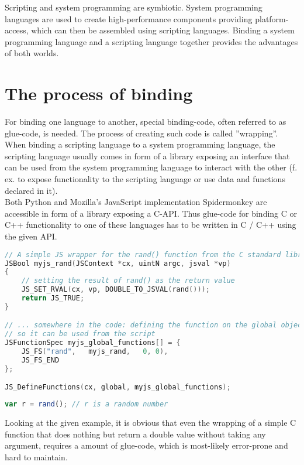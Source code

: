 Scripting and system programming are symbiotic. System programming languages are used to create high-performance components providing platform-access, which can then be assembled using scripting languages. Binding a system programming language and a scripting language together provides the advantages of both worlds.

\section{The process of binding}

For binding one language to another, special binding-code, often referred to as glue-code, is needed. The process of creating such code is called ''wrapping''. When binding a scripting language to a system programming language, the scripting language usually comes in form of a library exposing an interface that can be used from the system programming language to interact with the other (f. ex. to expose functionality to the scripting language or use data and functions declared in it).\\
Both Python and Mozilla's JavaScript implementation Spidermonkey are accessible in form of a library exposing a C-API. Thus glue-code for binding C or C++ functionality to one of these languages has to be written in C / C++ using the given API.

\begin{lstlisting}[language=C++, caption=Exposing a C function to Spidermonkey (taken from MDN)]
// A simple JS wrapper for the rand() function from the C standard library
JSBool myjs_rand(JSContext *cx, uintN argc, jsval *vp)
{
    // setting the result of rand() as the return value
    JS_SET_RVAL(cx, vp, DOUBLE_TO_JSVAL(rand()));
    return JS_TRUE;
}

// ... somewhere in the code: defining the function on the global object
// so it can be used from the script
JSFunctionSpec myjs_global_functions[] = {
    JS_FS("rand",   myjs_rand,   0, 0),
    JS_FS_END
};

JS_DefineFunctions(cx, global, myjs_global_functions);
\end{lstlisting}

\begin{lstlisting}[language=JavaScript, caption=Using a C function from SpiderMonkey]
var r = rand();	// r is a random number
\end{lstlisting}

Looking at the given example, it is obvious that even the wrapping of a simple C function that does nothing but return a double value without taking any argument, requires a  amount of glue-code, which is most-likely error-prone and hard to maintain.

